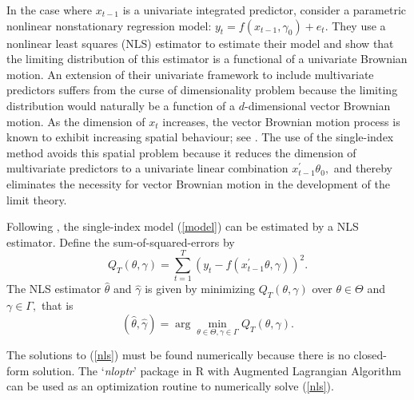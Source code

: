 \documentclass[a4paper,12pt,times,numbered,print,index]{report}
\numberwithin{equation}{section}
\begin{document}
	
	
	In the case where $x_{t-1}$ is a univariate integrated
	predictor, \cite{park2001nonlinear} consider a parametric nonlinear nonstationary
	regression model: $y_{t}=f\left( x_{t-1},\gamma _{0}\right) +e_{t}.$
	They use a nonlinear least squares (NLS) estimator to estimate their model
	and show that the limiting distribution of this estimator is a functional of a univariate Brownian motion. An extension of their univariate framework to include multivariate predictors suffers from the curse of dimensionality problem because the limiting distribution would naturally be a function of a $d$-dimensional vector Brownian motion. As the dimension of $x_{t}$ increases, the vector Brownian motion process is known to exhibit increasing
	spatial behaviour; see \cite{revuz2013continuous}. The use of the single-index method avoids this spatial problem because it reduces the dimension of multivariate predictors to a univariate linear combination $x_{t-1}^{\prime
	}\theta _{0},$ and thereby eliminates the necessity for vector Brownian motion in the development of the limit theory.
	
	
	Following \cite{chang2003index}, the single-index model (\ref{model}) can be estimated by a NLS estimator. Define the sum-of-squared-errors by%
	\[
	Q_{T}\left( \theta ,\gamma \right) =\sum_{t=1}^{T}\left( y_{t}-f\left(
	x_{t-1}^{\prime }\theta ,\gamma \right) \right) ^{2}. 
	\]%
	The NLS estimator $\hat{\theta}$ and $\hat{\gamma}$ is given by minimizing $%
	Q_{T}\left( \theta ,\gamma \right) $ over $\theta \in \Theta $ and $\gamma
	\in \Gamma ,$ that is%
	\begin{equation}
		\left( \widehat{\theta},\widehat{\gamma}\right) =\arg \min_{\theta \in \Theta
			,\gamma \in \Gamma }Q_{T}\left( \theta ,\gamma \right) .  \label{nls}
	\end{equation}%
	
	The solutions to (\ref{nls}) must be found numerically because there is no
	closed-form solution. The `\textit{nloptr}' package in R with Augmented Lagrangian Algorithm can be used as an optimization routine to numerically solve (\ref{nls}).
	
	
	
\end{document}
